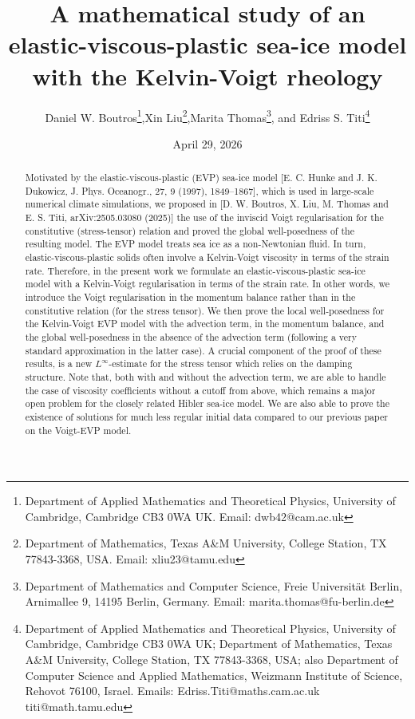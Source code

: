 \documentclass[12pt,a4paper]{article}
\theoremstyle{definition}
\theoremstyle{remark}
\numberwithin{equation}{section}
\begin{document}
\title{A mathematical study of an elastic-viscous-plastic sea-ice model with the Kelvin-Voigt rheology}
\author{Daniel W. Boutros\footnote{Department of Applied Mathematics and Theoretical Physics, University of Cambridge, Cambridge CB3 0WA UK. Email: \textsf{dwb42@cam.ac.uk}}\space,\space Xin Liu\footnote{Department of Mathematics, Texas A\&M University, College Station, TX 77843-3368, USA. Email: \textsf{xliu23@tamu.edu}}\space,\space Marita Thomas\footnote{Department of Mathematics and Computer Science, Freie Universität Berlin, Arnimallee 9, 14195 Berlin, Germany. Email: \textsf{marita.thomas@fu-berlin.de}}\space, and Edriss S. Titi\footnote{Department of Applied Mathematics and Theoretical Physics, University of Cambridge, Cambridge CB3 0WA UK; Department of Mathematics, Texas A\&M University, College Station, TX 77843-3368, USA; also Department of Computer Science and Applied Mathematics, Weizmann Institute of Science, Rehovot 76100, Israel. Emails: \textsf{Edriss.Titi@maths.cam.ac.uk} \; \textsf{titi@math.tamu.edu}}}

\date{April 29, 2026}

\maketitle

\begin{abstract}
Motivated by the elastic-viscous-plastic (EVP) sea-ice model [E. C. Hunke and J. K. Dukowicz, J. Phys. Oceanogr., 27, 9 (1997), 1849--1867], which is used in large-scale numerical climate simulations, we proposed in [D. W. Boutros, X. Liu, M. Thomas and E. S. Titi, arXiv:2505.03080 (2025)] the use of the inviscid Voigt regularisation for the constitutive (stress-tensor) relation and proved the global well-posedness of the resulting model. The EVP model treats sea ice as a non-Newtonian fluid. In turn, elastic-viscous-plastic solids often involve a Kelvin-Voigt viscosity in terms of the strain rate. Therefore, in the present work we formulate an elastic-viscous-plastic sea-ice model with a Kelvin-Voigt regularisation in terms of the strain rate. In other words, we introduce the Voigt regularisation in the momentum balance rather than in the constitutive relation (for the stress tensor). We then prove the local well-posedness for the Kelvin-Voigt EVP model with the advection term, in the momentum balance, and the global well-posedness in the absence of the advection term (following a very standard approximation in the latter case). A crucial component of the proof of these results, is a new $L^\infty$-estimate for the stress tensor which relies on the damping structure. Note that, both with and without the advection term, we are able to handle the case of viscosity coefficients without a cutoff from above, which remains a major open problem for the closely related Hibler sea-ice model. We are also able to prove the existence of solutions for much less regular initial data compared to our previous paper on the Voigt-EVP model.
\end{abstract}
\end{document}
